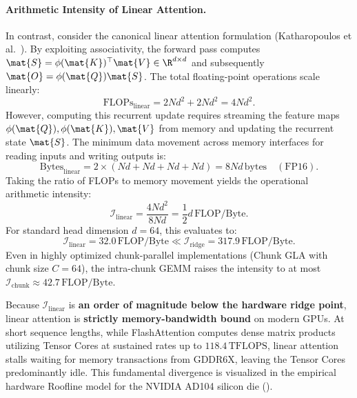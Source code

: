 \paragraph{Arithmetic Intensity of Linear Attention.}
In contrast, consider the canonical linear attention formulation (Katharopoulos et al.~\cite{katharopoulos2020transformers}). By exploiting associativity, the forward pass computes $\mat{S} = \phi(\mat{K})^\top \mat{V} \in \R^{d \times d}$ and subsequently $\mat{O} = \phi(\mat{Q}) \mat{S}$. The total floating-point operations scale linearly:
\begin{equation}
\label{eq:linear_flops}
\text{FLOPs}_{\text{linear}} = 2 N d^2 + 2 N d^2 = 4 N d^2.
\end{equation}
However, computing this recurrent update requires streaming the feature maps $\phi(\mat{Q}), \phi(\mat{K}), \mat{V}$ from memory and updating the recurrent state $\mat{S}$. The minimum data movement across memory interfaces for reading inputs and writing outputs is:
\begin{equation}
\label{eq:linear_bytes}
\text{Bytes}_{\text{linear}} = 2 \times \left( N d + N d + N d + N d \right) = 8 N d\,\text{bytes}\quad(\text{FP16}).
\end{equation}
Taking the ratio of FLOPs to memory movement yields the operational arithmetic intensity:
\begin{equation}
\label{eq:linear_intensity}
\mathcal{I}_{\text{linear}} = \frac{4 N d^2}{8 N d} = \frac{1}{2} d\,\text{FLOP/Byte}.
\end{equation}
For standard head dimension $d=64$, this evaluates to:
\begin{equation}
\label{eq:linear_intensity_val}
\mathcal{I}_{\text{linear}} = 32.0\,\text{FLOP/Byte} \ll \mathcal{I}_{\text{ridge}} = 317.9\,\text{FLOP/Byte}.
\end{equation}
Even in highly optimized chunk-parallel implementations (Chunk GLA with chunk size $C=64$), the intra-chunk GEMM raises the intensity to at most $\mathcal{I}_{\text{chunk}} \approx 42.7\,\text{FLOP/Byte}$.

Because $\mathcal{I}_{\text{linear}}$ is \textbf{an order of magnitude below the hardware ridge point}, linear attention is \textbf{strictly memory-bandwidth bound} on modern GPUs. At short sequence lengths, while FlashAttention computes dense matrix products utilizing Tensor Cores at sustained rates up to $118.4\,\text{TFLOPS}$, linear attention stalls waiting for memory transactions from GDDR6X, leaving the Tensor Cores predominantly idle. This fundamental divergence is visualized in the empirical hardware Roofline model for the NVIDIA AD104 silicon die ().

